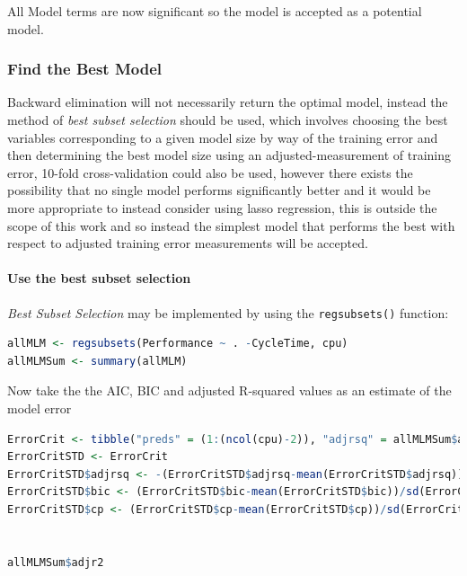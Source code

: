 \documentclass[
]{article}
\begin{document}
All Model terms are now significant so the model is accepted as a
potential model.

\hypertarget{find-the-best-model}{%
\subsubsection{Find the Best Model}\label{find-the-best-model}}

Backward elimination will not necessarily return the optimal model,
instead the method of \emph{best subset selection} should be used, which
involves choosing the best variables corresponding to a given model size
by way of the training error and then determining the best model size
using an adjusted-measurement of training error, 10-fold
cross-validation could also be used, however there exists the
possibility that no single model performs significantly better and it
would be more appropriate to instead consider using lasso regression,
this is outside the scope of this work and so instead the simplest model
that performs the best with respect to adjusted training error
measurements will be accepted.

\hypertarget{use-the-best-subset-selection}{%
\paragraph{Use the best subset
selection}\label{use-the-best-subset-selection}}

\textit{Best Subset Selection} may be implemented by using the \verb|regsubsets()| function:

\begin{lstlisting}[language=R]
allMLM <- regsubsets(Performance ~ . -CycleTime, cpu)
allMLMSum <- summary(allMLM)
\end{lstlisting}

Now take the the AIC, BIC and adjusted R-squared values as an estimate
of the model error

\begin{lstlisting}[language=R]
ErrorCrit <- tibble("preds" = (1:(ncol(cpu)-2)), "adjrsq" = allMLMSum$adjr2, "bic" = allMLMSum$bic, "cp"= allMLMSum$cp)
ErrorCritSTD <- ErrorCrit
ErrorCritSTD$adjrsq <- -(ErrorCritSTD$adjrsq-mean(ErrorCritSTD$adjrsq))/sd(ErrorCritSTD$adjrsq)
ErrorCritSTD$bic <- (ErrorCritSTD$bic-mean(ErrorCritSTD$bic))/sd(ErrorCritSTD$bic)
ErrorCritSTD$cp <- (ErrorCritSTD$cp-mean(ErrorCritSTD$cp))/sd(ErrorCritSTD$cp)


allMLMSum$adjr2
\end{lstlisting}
\end{document}
